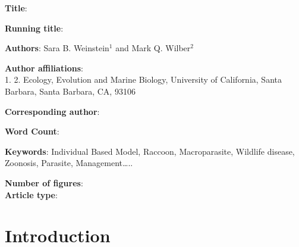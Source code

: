 \documentclass[11pt]{article}
\begin{document}
\noindent
\textbf{Title}: 

\bigskip

\noindent
\textbf{Running title}: 

\bigskip

\noindent
\textbf{Authors}: Sara B. Weinstein$^1$ and Mark Q. Wilber$^2$

\bigskip

\noindent
\textbf{Author affiliations}: \\
1. 
2. Ecology, Evolution and Marine Biology, University of California, Santa Barbara, Santa Barbara, CA, 93106

\bigskip

\noindent
\textbf{Corresponding author}:

\bigskip

\noindent
\textbf{Word Count}: 

\bigskip

\noindent
\textbf{Keywords}: Individual Based Model, Raccoon, Macroparasite,
Wildlife disease, Zoonosis, Parasite, Management\ldots{}..

\bigskip

\noindent
\textbf{Number of figures}:  \\
\textbf{Article type}: 

\clearpage

\section{Introduction}
\end{document}

